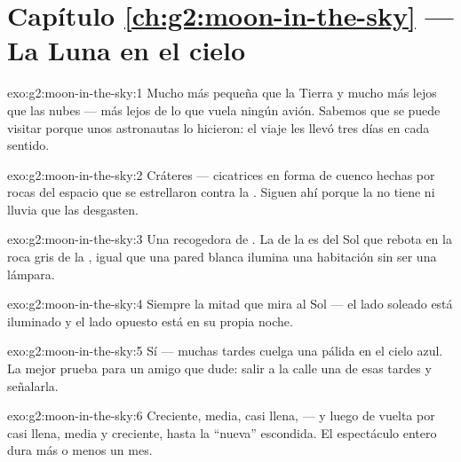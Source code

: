 \section*{Capítulo \ref{ch:g2:moon-in-the-sky} --- La Luna en el cielo}

\begin{solution}{exo:g2:moon-in-the-sky:1}
Mucho más pequeña que la Tierra y mucho más lejos que las nubes ---
más lejos de lo que vuela ningún avión. Sabemos que se puede visitar
porque unos astronautas lo hicieron: el viaje les llevó tres días en
cada sentido.
\end{solution}

\begin{solution}{exo:g2:moon-in-the-sky:2}
Cráteres --- cicatrices en forma de cuenco hechas por rocas del
espacio que se estrellaron contra la . Siguen ahí porque la
 no tiene  ni lluvia que las desgasten.
\end{solution}

\begin{solution}{exo:g2:moon-in-the-sky:3}
Una recogedora de . La  de la  es  del Sol que rebota en
la roca gris de la , igual que una pared blanca ilumina una
habitación sin ser una lámpara.
\end{solution}

\begin{solution}{exo:g2:moon-in-the-sky:4}
Siempre la mitad que mira al Sol --- el lado soleado está iluminado y
el lado opuesto está en su propia noche.
\end{solution}

\begin{solution}{exo:g2:moon-in-the-sky:5}
Sí --- muchas tardes cuelga una  pálida en el cielo azul. La mejor
prueba para un amigo que dude: salir a la calle una de esas tardes y
señalarla.
\end{solution}

\begin{solution}{exo:g2:moon-in-the-sky:6}
Creciente, media, casi llena,  --- y luego de vuelta
por casi llena, media y creciente, hasta la  ``nueva''
escondida. El espectáculo entero dura más o menos un mes.
\end{solution}

